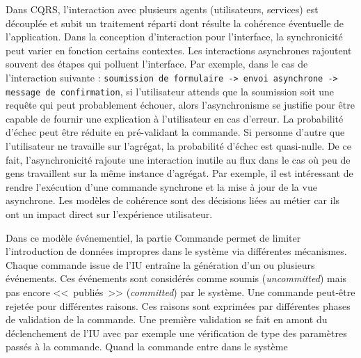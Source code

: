 Dans \gls{CQRS}, l'interaction avec plusieurs agents (utilisateurs, services) est 
découplée et subit un traitement réparti 
dont résulte la cohérence éventuelle de l'application. 
Dans la conception d'interaction pour l'interface, la synchronicité peut varier en 
fonction certains contextes. 
Les interactions asynchrones rajoutent souvent des étapes qui polluent l'interface.  
Par exemple, dans le cas de l'interaction suivante : \texttt{soumission de 
formulaire -> envoi asynchrone -> message de confirmation}, si l'utilisateur attends 
que la soumission soit une requête qui peut probablement échouer, alors 
l'asynchronisme se justifie pour être capable de fournir une explication à 
l'utilisateur en cas d'erreur. 
La probabilité d'échec peut être réduite en pré-validant la commande. Si personne 
d'autre que 
l'utilisateur ne travaille sur l'agrégat, la probabilité d'échec est quasi-nulle. De ce fait, 
l'asynchronicité rajoute une interaction inutile au flux dans le cas où peu de gens 
travaillent sur la même instance d'agrégat.
Par exemple, il est intéressant de rendre l'exécution d'une 
commande synchrone et la mise à jour de la vue asynchrone. Les modèles de 
cohérence sont des décisions liées au métier car ils ont un impact direct sur 
l'expérience utilisateur. 


Dans ce modèle événementiel, la partie Commande permet de limiter l'introduction 
de données impropres dans le système via différentes mécanismes. Chaque 
commande issue de l'\gls{IU} entraîne la génération d'un ou plusieurs événements. 
Ces événements sont considérés 
comme \og soumis\fg{} (\textit{uncommitted}) mais pas encore <<~publiés~>> 
(\textit{committed}) par le système.
Une commande peut-être rejetée pour différentes raisons. Ces raisons sont 
exprimées par différentes phases de validation de la commande.
Une première validation se fait en amont du déclenchement de l'\gls{IU} avec par 
exemple une vérification de type des paramètres passés à la commande.
Quand la commande entre dans le système

%
%


